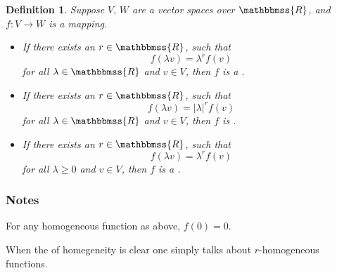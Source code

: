 \documentclass[12pt]{article}
\newcommand{\R}{\mathbbmss{R}}
\newtheorem{defn}{Definition}
\begin{document}
\begin{defn} Suppose $V,\,W$ are a vector spaces over $\R$, 
and $f\colon V \to W$ is a mapping. 
\begin{itemize}
\item 
   If there exists an $r \in \R$, such that
   $$
     f(\lambda v) = \lambda^r f(v)
   $$
   for all $\lambda \in \R$ and $v\in V$, then $f$ is 
   a .
\item 
   If there exists an $r\in \R$, such that
   $$
     f(\lambda v) = |\lambda|^r f(v)
   $$
   for all $\lambda \in \R$ and $v\in V$, 
   then $f$ is 
   .
\item 
   If there exists an $r\in \R$, such that
   $$
     f(\lambda v) = \lambda^r f(v)
   $$
   for all $\lambda \ge 0$ and $v\in V$, then $f$ is 
   a .
\end{itemize}
\end{defn}

\subsubsection*{Notes}
For any homogeneous function as above, $f(0)=0$.

When the  of homegeneity is clear one simply talks about
$r$-homogeneous functions.
\end{document}
